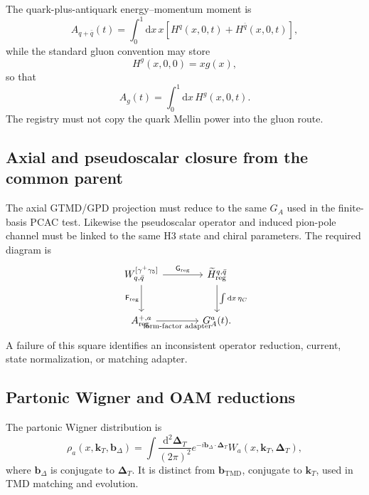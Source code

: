 \documentclass[11pt]{article}
\newcommand{\kT}{\bm{k}_{T}}
\newcommand{\DT}{\bm{\Delta}_{T}}
\newcommand{\bD}{\bm{b}_{\Delta}}
\newcommand{\bM}{\bm{b}_{\mathrm{TMD}}}
\newcommand{\dd}{\mathrm{d}}
\newcommand{\reg}{\mathrm{reg}}
\begin{document}
The quark-plus-antiquark energy--momentum moment is
\begin{equation}
 A_{q+\bar q}(t)
 =\int_0^1\dd x\,x
 \left[
 H^q(x,0,t)+H^{\bar q}(x,0,t)
 \right],
\end{equation}
while the standard gluon convention may store
\begin{equation}
 H^g(x,0,0)=xg(x),
\end{equation}
so that
\begin{equation}
 A_g(t)=\int_0^1\dd x\,H^g(x,0,t).
\end{equation}
The registry must not copy the quark Mellin power into the gluon route.

\subsection{Axial and pseudoscalar closure from the common parent}

The axial GTMD/GPD projection must reduce to the same \(G_A\) used in the
finite-basis PCAC test.  Likewise the pseudoscalar operator and induced
pion-pole channel must be linked to the same H3 state and chiral parameters.
The required diagram is
\begin{equation}
\begin{tikzcd}[column sep=large,row sep=large]
 W_{q,\bar q}^{[\gamma^+\gamma_5]}
 \arrow[r,"\mathsf G_{\reg}"]
 \arrow[d,"\mathsf F_{\reg}"']
 & \widetilde H^{q,\bar q}_{\reg}
 \arrow[d,"\int\dd x\,\eta_C"]\\
 A_{\reg}^{+,a}
 \arrow[r,"\text{form-factor adapter}"']
 & G_A^a(t).
\end{tikzcd}
\label{eq:axial-commuting-square}
\end{equation}
A failure of this square identifies an inconsistent operator reduction,
current, state normalization, or matching adapter.

\subsection{Partonic Wigner and OAM reductions}

The partonic Wigner distribution is \cite{Meissner2009,Lorce2011}
\begin{equation}
 \rho_a(x,\kT,\bD)
 =
 \int\frac{\dd^2\DT}{(2\pi)^2}
 e^{-i\bD\cdot\DT}
 W_a(x,\kT,\DT),
 \label{eq:wigner}
\end{equation}
where \(\bD\) is conjugate to \(\DT\).  It is distinct from
\(\bM\), conjugate to \(\kT\), used in TMD matching and evolution.
\end{document}
